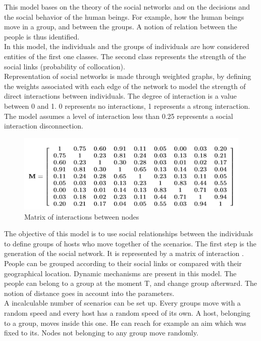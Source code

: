 This model bases on the theory of the social networks and on the decisions and the social behavior of the human beings. For example, how the human beings move in a group, and between the groups. A notion of relation between the people is thus identified.\\
In this model, the individuals and the groups of individuals are how considered entities of the first one classes. The second class represents the strength of the social links (probability of collocation).\\

Representation of social networks is made through weighted graphs, by defining the weights associated with each edge of the network to model the strength of direct interactions between individuals. The degree of interaction is a value between 0 and 1. 0 represents no interactions, 1 represents a strong interaction.
The model assumes a level of interaction less than 0.25 represents a social interaction disconnection.\\

\begin{figure}[h]
\center
\includegraphics{../images/MatrixInteractionSocialNetwork.png}
\caption{\label{MatricSN}Matrix of interactions between nodes}
\label{MatricSN}
\end{figure}

The objective of this model is to use social relationships between the individuals to define groups of hosts who move together of the scenarios.
The first step is the generation of the social network. It is represented by a matrix of interaction \pageref{MatricSN}.\\

People can be grouped according to their social links or compared with their geographical location. Dynamic mechanisms are present in this model. The people can belong to a group at the moment T, and change group afterward. The notion of distance goes in account into the parameters.\\
A incalculable number of scenarios can be set up. Every groups move with a random speed and every host has a random speed of its own. A host, belonging to a group, moves inside this one. He can reach for example an aim which was fixed to its. Nodes not belonging to any group move randomly.\\

